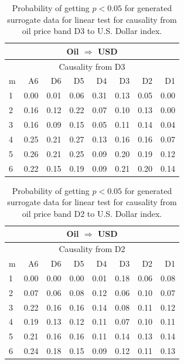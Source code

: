 %
%
\begin{table}[H]
\begin{center}
\begin{tabular}{l|r r r r r r r}
\hline\hline
\multicolumn{8}{c}{Oil $\Rightarrow$ USD}\\
\hline
\multicolumn{8}{c}{Causality from D3}\\
\hline\hline
m & A6 & D6 & D5 & D4 & D3 & D2 & D1 \\
\hline
1 & 0.00 & 0.01 & 0.06 & 0.31 & 0.13 & 0.05 & 0.00 \\
2 & 0.16 & 0.12 & 0.22 & 0.07 & 0.10 & 0.13 & 0.00 \\
3 & 0.16 & 0.09 & 0.15 & 0.05 & 0.11 & 0.14 & 0.04 \\
4 & 0.25 & 0.21 & 0.27 & 0.13 & 0.16 & 0.16 & 0.07 \\
5 & 0.26 & 0.21 & 0.25 & 0.09 & 0.20 & 0.19 & 0.12 \\
6 & 0.22 & 0.15 & 0.19 & 0.09 & 0.21 & 0.20 & 0.14 \\
\hline\hline
\end{tabular}
\caption{Probability of getting $p < 0.05$ for generated surrogate data for linear test for causality from oil price band D3 to U.S. Dollar index.}
\end{center}
\end{table}

%
%
\begin{table}[H]
\begin{center}
\begin{tabular}{l|r r r r r r r}
\hline\hline
\multicolumn{8}{c}{Oil $\Rightarrow$ USD}\\
\hline
\multicolumn{8}{c}{Causality from D2}\\
\hline\hline
m & A6 & D6 & D5 & D4 & D3 & D2 & D1 \\
\hline
1 & 0.00 & 0.00 & 0.00 & 0.01 & 0.18 & 0.06 & 0.08 \\
2 & 0.07 & 0.06 & 0.08 & 0.12 & 0.06 & 0.10 & 0.07 \\
3 & 0.22 & 0.16 & 0.16 & 0.14 & 0.08 & 0.11 & 0.12 \\
4 & 0.19 & 0.13 & 0.12 & 0.11 & 0.07 & 0.10 & 0.11 \\
5 & 0.21 & 0.16 & 0.16 & 0.11 & 0.14 & 0.13 & 0.14 \\
6 & 0.24 & 0.18 & 0.15 & 0.09 & 0.12 & 0.11 & 0.13 \\
\hline\hline
\end{tabular}
\caption{Probability of getting $p < 0.05$ for generated surrogate data for linear test for causality from oil price band D2 to U.S. Dollar index.}
\end{center}
\end{table}

